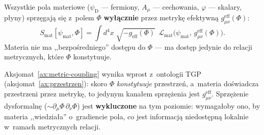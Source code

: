 \begin{axiom}\label{ax:metric-coupling}
Wszystkie pola materiowe ($\psi_{\mathrm{D}}$ --- fermiony,
$A_\mu$ --- cechowania, $\varphi$ --- skalary, p\l{}yny)
sprz\k{e}gaj\k{a} si\k{e} z~polem $\Phi$ \textbf{wy\l{}\k{a}cznie}
przez metryk\k{e} efektywn\k{a} $g_{\mu\nu}^{\mathrm{eff}}(\Phi)$:
\begin{equation}\label{eq:metric-coupling}
  \boxed{
    S_{\mathrm{mat}}[\psi_{\mathrm{mat}}, \Phi]
    = \int d^4x\;\sqrt{-g_{\mathrm{eff}}(\Phi)}\;\,
      \mathcal{L}_{\mathrm{mat}}\!\bigl(
        \psi_{\mathrm{mat}},\, g^{\mathrm{eff}}_{\mu\nu}(\Phi)
      \bigr).
  }
\end{equation}
Materia nie ma ,,bezpo\'sredniego'' dost\k{e}pu do $\Phi$ ---
ma dost\k{e}p jedynie do relacji metrycznych, kt\'ore $\Phi$
konstytuuje.
%
%
%
\end{axiom}

\begin{remark}
Aksjomat~\ref{ax:metric-coupling} wynika wprost z~ontologii TGP
(aksjomat~\ref{ax:przestrzen}): skoro $\Phi$ \emph{konstytuuje}
przestrze\'n, a~materia do\'swiadcza przestrzeni przez metryk\k{e},
to jedynym kana\l{}em sprz\k{e}\.zenia jest $g_{\mu\nu}^{\mathrm{eff}}$.
Sprz\k{e}\.zenie dysformaln\k{e} ($\sim \partial_\mu\Phi\,\partial_\nu\Phi$)
jest \textbf{wykluczone} na tym poziomie: wymaga\l{}oby ono, by
materia ,,wiedzia\l{}a'' o~gradiencie pola, co jest informacj\k{a}
niedost\k{e}pn\k{a} lokalnie w~ramach metrycznych relacji.
\end{remark}

